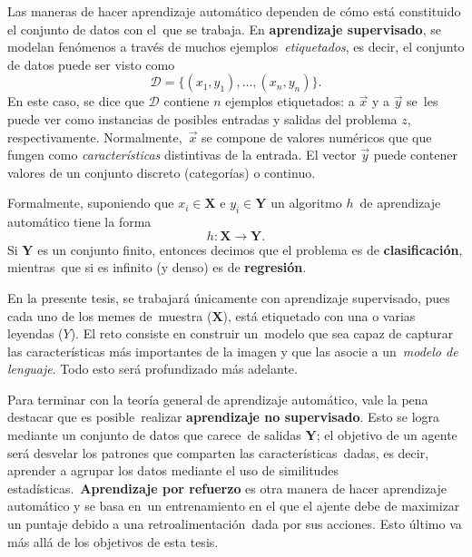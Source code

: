 Las maneras de hacer aprendizaje automático dependen de cómo está constituido el conjunto de datos con el\
que se trabaja. En \textbf{aprendizaje supervisado}, se modelan fenómenos a través de muchos ejemplos\
\emph{etiquetados}, es decir, el conjunto de datos puede ser visto como
\begin{equation}
  \mathcal{D} = \{(x_1, y_1),\ldots,(x_n, y_n)\}.
\end{equation}
En este caso, se dice que $\mathcal{D}$ contiene $n$ ejemplos etiquetados: a $\vec{x}$ y a $\vec{y}$ se\
les puede ver como instancias de posibles entradas y salidas del problema $z$, respectivamente. Normalmente,\
$\vec{x}$ se compone de valores numéricos que que fungen como \emph{características} distintivas de la entrada.
El vector $\vec{y}$ puede contener valores de un conjunto discreto (categorías) o continuo.\par
Formalmente, suponiendo que $x_i \in \mathbf{X}$ e $y_i \in \mathbf{Y}$ un algoritmo $h$\
de aprendizaje automático tiene la forma
\begin{equation}
  h: \mathbf{X} \longrightarrow \mathbf{Y}.
\end{equation}
Si $\mathbf{Y}$ es un conjunto finito, entonces decimos que el problema es de \textbf{clasificación}, mientras\
que si es infinito (y denso) es de \textbf{regresión}.\par
En la presente tesis, se trabajará únicamente con aprendizaje supervisado, pues cada uno de los memes de\
muestra ($\mathbf{X}$), está etiquetado con una o varias leyendas ($Y$). El reto consiste en construir un\
modelo que sea capaz de capturar las características más importantes de la imagen y que las asocie a un\
\emph{modelo de lenguaje}. Todo esto será profundizado más adelante.\par
Para terminar con la teoría general de aprendizaje automático, vale la pena destacar que es posible\
realizar \textbf{aprendizaje no supervisado}. Esto se logra mediante un conjunto de datos que carece\
de salidas $\mathbf{Y}$; el objetivo de un agente será desvelar los patrones que comparten las características\
dadas, es decir, aprender a agrupar los datos mediante el uso de similitudes estadísticas.\
\textbf{Aprendizaje por refuerzo} es otra manera de hacer aprendizaje automático y se basa en\
un entrenamiento en el que el ajente debe de maximizar un puntaje debido a una retroalimentación\
dada por sus acciones. Esto último va más allá de los objetivos de esta tesis.
